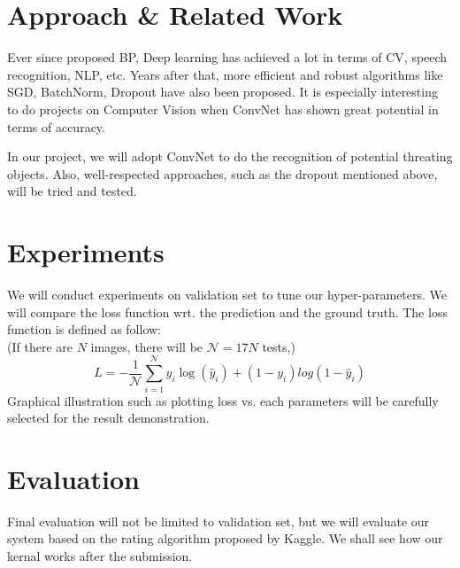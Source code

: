 \documentclass[conference,compsoc]{IEEEtran}
\begin{document}
\section{Approach \& Related Work}
	\par
	Ever since \cite{hinton2006fast} proposed BP, Deep learning has achieved a lot in terms of CV, speech recognition, NLP, etc.
	Years after that, more efficient and robust algorithms like SGD\cite{bottou2010large, lecun2012efficient}, BatchNorm\cite{ioffe2015batch}, Dropout\cite{hinton2012improving, srivastava2014dropout} have also been proposed. It is especially interesting to do projects on Computer Vision when ConvNet\cite{krizhevsky2012imagenet} has shown great potential in terms of accuracy.
	\par
	In our project, we will adopt ConvNet to do the recognition of potential threating objects. Also, well-respected approaches, such as the dropout mentioned above, will be tried and tested.
\section{Experiments}
	We will conduct experiments on validation set to tune our hyper-parameters. We will compare the loss function wrt. the prediction and the ground truth. The loss function is defined as follow: \\
	(If there are $N$ images, there will be $\mathcal{N} = 17N$ tests,)
	$$ L = -\frac{1}{\mathcal{N}}\sum_{i=1}^\mathcal{N}{y_i\log(\hat{y}_i) + (1-y_i)log(1-\hat{y}_i)}$$
	Graphical illustration such as plotting loss vs. each parameters will be carefully selected for the result demonstration.
\section{Evaluation}
	Final evaluation will not be limited to validation set, but we will evaluate our system based on the rating algorithm proposed by Kaggle. We shall see how our kernal works after the submission.




\end{document}
